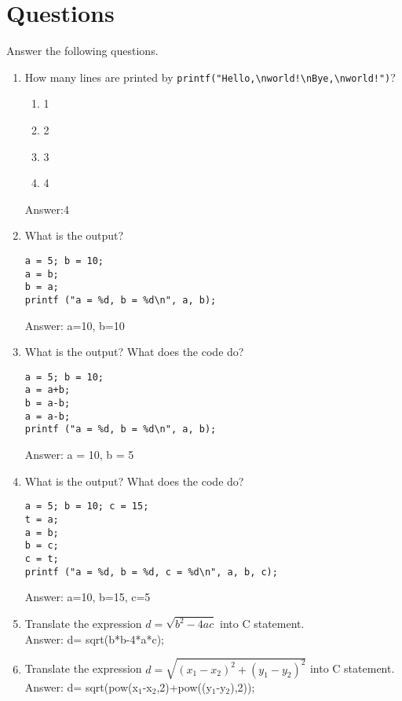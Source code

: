 \documentclass[11pt]{article}
\begin{document}
\section{Questions}
\label{sec-2}
Answer the following questions.
\begin{enumerate}
\item How many lines are printed by \texttt{printf("Hello,\textbackslash{}nworld!\textbackslash{}nBye,\textbackslash{}nworld!")}?
\begin{enumerate}
\item 1
\item 2
\item 3
\item 4
\end{enumerate}
Answer:4
\item What is the output?
\begin{verbatim}
a = 5; b = 10;
a = b;
b = a;
printf ("a = %d, b = %d\n", a, b);
\end{verbatim}
Answer: a=10, b=10

\item What is the output? What does the code do?
\begin{verbatim}
a = 5; b = 10;
a = a+b;
b = a-b;
a = a-b;
printf ("a = %d, b = %d\n", a, b);
\end{verbatim}
Answer: a = 10, b = 5

\item What is the output? What does the code do?
\begin{verbatim}
a = 5; b = 10; c = 15;
t = a;
a = b;
b = c;
c = t;
printf ("a = %d, b = %d, c = %d\n", a, b, c);
\end{verbatim}
Answer: a=10, b=15, c=5

\item Translate the expression $d = \sqrt{b^2 - 4ac}$ into C statement.\\

Answer: d= sqrt(b*b-4*a*c);

\item Translate the expression $d = \sqrt{(x_1 - x_2)^2 + (y_1 -
     y_2)^2}$ into C statement.\\

Answer: d= sqrt(pow(x$_{\text{1}}$-x$_{\text{2}}$,2)+pow((y$_{\text{1}}$-y$_{\text{2}}$),2));


\end{enumerate}
\end{document}

